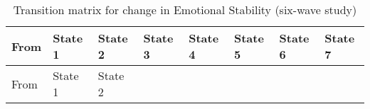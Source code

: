 \documentclass[
  single column]{article}
\begin{document}
\begin{longtable}[]{@{}
  >{\centering\arraybackslash}p{}
  >{\centering\arraybackslash}p{}
  >{\centering\arraybackslash}p{}
  >{\centering\arraybackslash}p{}
  >{\centering\arraybackslash}p{}
  >{\centering\arraybackslash}p{}
  >{\centering\arraybackslash}p{}
  >{\centering\arraybackslash}p{}@{}}
\caption{Transition matrix for change in Emotional Stability (six-wave
study)}\label{tbl-table-transition-emotional_stability-long}\tabularnewline
\toprule\noalign{}
\begin{minipage}[b]{\linewidth}\centering
From
\end{minipage} & \begin{minipage}[b]{\linewidth}\centering
State 1
\end{minipage} & \begin{minipage}[b]{\linewidth}\centering
State 2
\end{minipage} & \begin{minipage}[b]{\linewidth}\centering
State 3
\end{minipage} & \begin{minipage}[b]{\linewidth}\centering
State 4
\end{minipage} & \begin{minipage}[b]{\linewidth}\centering
State 5
\end{minipage} & \begin{minipage}[b]{\linewidth}\centering
State 6
\end{minipage} & \begin{minipage}[b]{\linewidth}\centering
State 7
\end{minipage} \\
\midrule\noalign{}
\endfirsthead
\toprule\noalign{}
\begin{minipage}[b]{\linewidth}\centering
From
\end{minipage} & \begin{minipage}[b]{\linewidth}\centering
State 1
\end{minipage} & \begin{minipage}[b]{\linewidth}\centering
State 2
\end{minipage} & \begin{minipage}[b]{\linewidth}\centering

\end{minipage}
\end{longtable}
\end{document}
